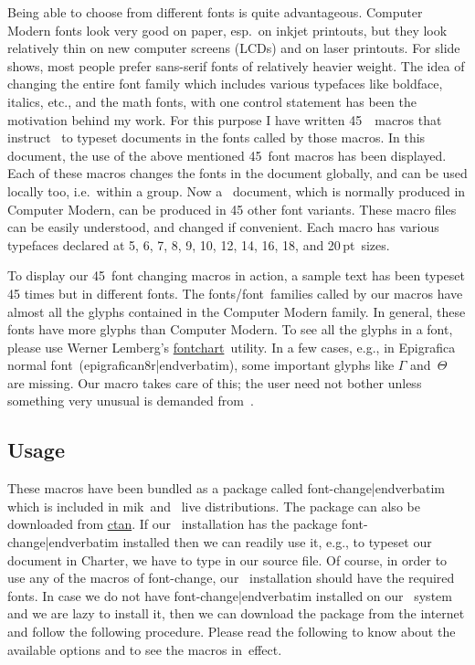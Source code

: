 {{Being able to choose from different fonts is quite advantageous. Computer Modern fonts look very good on paper, esp.\ on inkjet printouts, but they look relatively thin on new computer screens (LCDs) and on laser printouts. For slide shows, most people prefer sans-serif fonts of relatively heavier weight. The idea of changing the entire font family which includes various typefaces like boldface, italics, etc., and the math fonts, with one control statement has been the motivation behind my work. For this purpose I have written 45~\capstex\ macros that instruct \capstex\ to typeset documents in the fonts called by those macros. In this document, the use of the above mentioned 45~font macros has been displayed. Each of these macros changes the fonts in the document globally, and can be used locally too, i.e.\ within a group. Now a \capstex\ document, which is normally produced in Computer Modern, can be produced in 45 other font variants. These macro files can be easily understood, and changed if convenient. Each macro has various typefaces declared at 5, 6, 7, 8, 9, 10, 12, 14, 16, 18, and 20\,pt~sizes.

To display our 45~font changing macros in action, a sample text has been typeset 45 times but in different fonts. The fonts/font~families called by our macros have almost all the glyphs contained in the Computer Modern family. In general, these fonts have more glyphs than Computer Modern. To see all the glyphs in a font, please use Werner Lemberg's \href{http://www.tex.ac.uk/ctan/help/Catalogue/entries/fontchart.html}{fontchart}~utility. In a few cases, e.g., in Epigrafica normal font~(\verbatim epigrafican8r|endverbatim), some important glyphs like $\Gamma$ and~$\Theta$ are missing. Our macro takes care of this; the user need not bother unless something very unusual is demanded from~\capstex.



\subsection{Usage}These macros have been bundled as a package called  {\color{brown}\verbatim font-change|endverbatim} which is included in {\caps m{\eightrm i}k}\capstex\ and \capstex~{\caps l{\eightrm ive}} distributions. The package can also be downloaded from \href{http://www.ctan.org/tex-archive/macros/plain/contrib/font-change/}{\caps ctan}. If our \capstex\ installation has the package {\color{brown}\verbatim font-change|endverbatim} installed then we can readily use it, e.g., to typeset our document in Charter, we have to type {\color{brown}\verbatim } in our source file. Of course, in order to use any of the macros of font-change, our \capstex\ installation should have the required fonts. In case we do not have {\color{brown}\verbatim font-change|endverbatim} installed on our \capstex\ system and we are lazy to install it, then we can download the package from the internet and follow the following procedure. Please read the following to know about the available options and to see the macros in~effect.

}}
